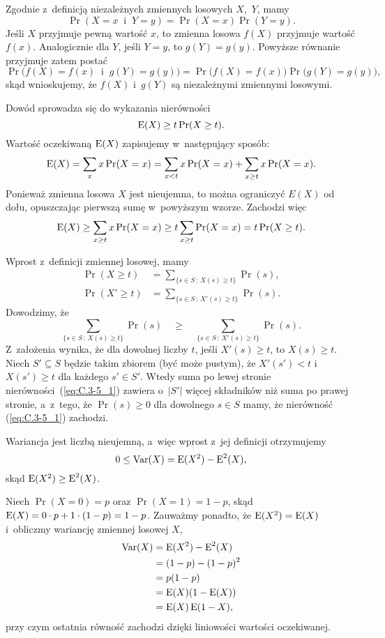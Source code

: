 \exercise{} %
Zgodnie z~definicją niezależnych zmiennych losowych $X$,~$Y$\!, mamy
\[
	\Pr(X=x\;\;\text{i}\;\;Y=y) = \Pr(X=x)\Pr(Y=y).
\]
Jeśli $X$ przyjmuje pewną wartość $x$, to zmienna losowa $f(X)$ przyjmuje wartość $f(x)$. Analogicznie dla $Y$\!, jeśli $Y=y$, to $g(Y)=g(y)$. Powyższe równanie przyjmuje zatem postać
\[
	\Pr\bigl(f(X)=f(x)\;\;\text{i}\;\;g(Y)=g(y)\bigr) = \Pr\bigl(f(X)=f(x)\bigr)\Pr\bigl(g(Y)=g(y)\bigr),
\]
skąd wnioskujemy, że $f(X)$ i~$g(Y)$ są niezależnymi zmiennymi losowymi.

\exercise{} %
Dowód sprowadza się do wykazania nierówności
\[
	\operatorname{E}(X) \ge t\Pr(X\ge t).
\]
Wartość oczekiwaną $\operatorname{E}(X)$ zapisujemy w~następujący sposób:
\[
    \operatorname{E}(X) = \sum_xx\Pr(X=x) = \sum_{x<t}x\Pr(X=x)+\sum_{x\ge t}x\Pr(X=x).
\]
Ponieważ zmienna losowa $X$ jest nieujemna, to można ograniczyć $E(X)$ od dołu, opuszczając pierwszą sumę w~powyższym wzorze. Zachodzi więc
\[
    \operatorname{E}(X) \ge \sum_{x\ge t}x\Pr(X=x) \ge t\sum_{x\ge t}\Pr(X=x) = t\Pr(X\ge t).
\]

\exercise{} %
Wprost z~definicji zmiennej losowej, mamy
\begin{align*}
	\Pr(X\ge t) &= \sum_{\{s\in S\,:\,X(s)\ge t\}}\Pr(s), \\
	\Pr(X'\ge t) &= \sum_{\{s\in S\,:\,X'(s)\ge t\}}\Pr(s).
\end{align*}
Dowodzimy, że
\[
	\sum_{\{s\in S\,:\,X(s)\ge t\}}\Pr(s)\quad \ge \quad\sum_{\{s\in S\,:\,X'(s)\ge t\}}\Pr(s). \tag{$*$}\label{eq:C.3-5_1}
\]
Z~założenia wynika, że dla dowolnej liczby $t$, jeśli $X'(s)\ge t$, to $X(s)\ge t$. Niech $S'\subseteq S$ będzie takim zbiorem (być może pustym), że $X'(s')<t$ i~$X(s')\ge t$ dla każdego $s'\in S'$. Wtedy suma po lewej stronie nierówności~(\ref{eq:C.3-5_1}) zawiera o~$|S'|$ więcej składników niż suma po prawej stronie, a~z~tego, że $\Pr(s)\ge0$ dla dowolnego $s\in S$ mamy, że nierówność (\ref{eq:C.3-5_1}) zachodzi.

\exercise{} %
Wariancja jest liczbą nieujemną, a~więc wprost z~jej definicji otrzymujemy
\[
	0 \le \operatorname{Var}(X) = \operatorname{E}(X^2)-\operatorname{E}^2(X),
\]
skąd $\operatorname{E}(X^2)\ge\operatorname{E}^2(X)$.

\exercise{} %
Niech $\Pr(X=0)=p$ oraz $\Pr(X=1)=1-p$, skąd $\operatorname{E}(X)=0\cdot p+1\cdot(1-p)=1-p$. Zauważmy ponadto, że $\operatorname{E}(X^2)=\operatorname{E}(X)$ i~obliczmy wariancję zmiennej losowej $X$,
\begin{align*}
	\operatorname{Var}(X) &= \operatorname{E}(X^2)-\operatorname{E}^2(X) \\
	&= (1-p)-(1-p)^2 \\
	&= p(1-p) \\
	&= \operatorname{E}(X)(1-\operatorname{E}(X)) \\
	&= \operatorname{E}(X)\operatorname{E}(1-X),
\end{align*}
przy czym ostatnia równość zachodzi dzięki liniowości wartości oczekiwanej.

